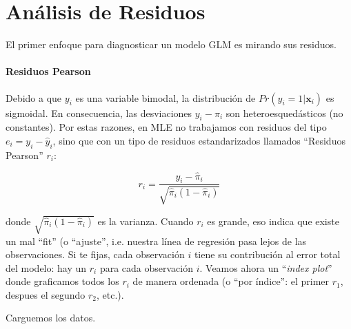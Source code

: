 \documentclass[onesided]{article}\usepackage[]{graphicx}\usepackage[]{color}
\begin{document}
\section{An\'alisis de Residuos}

El primer enfoque para diagnosticar un modelo GLM es mirando sus residuos.

\paragraph{Residuos Pearson} Debido a que $y_{i}$ es una variable bimodal, la distribuci\'on de $Pr(y_{i}=1|{\mathbf x}_{i})$ es sigmoidal. En consecuencia, las desviaciones $y_{i}-\pi_{i}$ son heteroesqued\'asticos (no constantes). Por estas razones, en MLE no trabajamos con residuos del tipo $e_{i} = y_{i} - \hat y_{i} $, sino que con un tipo de residuos estandarizados llamados ``Residuos Pearson'' $r_{i}$:

\begin{equation}\label{r:pearson}
r_{i} = \frac{y_{i}-\hat \pi_{i}}{\sqrt{\hat \pi_{i}(1-\hat \pi_{i})}}
\end{equation}

donde $\sqrt{\hat \pi_{i}(1-\hat \pi_{i})}$ es la varianza. Cuando $r_{i}$ es grande, eso indica que existe un mal ``fit'' (o ``ajuste'', i.e. nuestra l\'inea de regresi\'on pasa lejos de las observaciones. Si te fijas, cada observaci\'on $i$ tiene su contribuci\'on al error total del modelo: hay un $r_{i}$ para cada observaci\'on $i$. Veamos ahora un ``\emph{index plot}'' donde graficamos todos los $r_{i}$ de manera ordenada (o ``por \'indice'': el primer $r_{1}$, despues el segundo $r_{2}$, etc.). 

Carguemos los datos.
\end{document}
